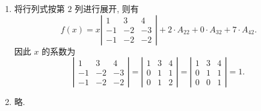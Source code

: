 \begin{enumerate}
\begin{proof}
\begin{align*}
\begin{array}{ccccc}
                        \vdots & \vdots & \ddots & \vdots & \vdots \\
                        0 & 0 & \cdots & b_{n-1} & 0 \\
                        0 & 0 & \cdots & 0 & b_n
                    \end{array}
                \right| \\
                &= (-1)^{\frac{(n-1)n}{2}}b_1b_2 \cdots b_n. \qedhere   
            \end{align*}
        \end{proof}
    \item %
        将行列式按第 $2$ 列进行展开, 则有
        \[
            f(x) = x
            \left|
                \begin{array}{cccc}
                    1 & 3 & 4 \\
                    -1 & -2 & -3 \\
                    -1 & -2 & -2
                \end{array}
            \right|
            + 2 \cdot A_{22} + 0 \cdot A_{32} + 7 \cdot A_{42}.    
        \]
        因此 $x$ 的系数为
        \[
            \left|
                \begin{array}{cccc}
                    1 & 3 & 4 \\
                    -1 & -2 & -3 \\
                    -1 & -2 & -2
                \end{array}
            \right|
            =
            \left|
                \begin{array}{cccc}
                    1 & 3 & 4 \\
                    0 & 1 & 1 \\
                    0 & 1 & 2
                \end{array}
            \right|
            =
            \left|
                \begin{array}{cccc}
                    1 & 3 & 4 \\
                    0 & 1 & 1 \\
                    0 & 0 & 1
                \end{array}
            \right|
            = 1. 
        \]
    \item %
        略.
\end{enumerate}
% 
